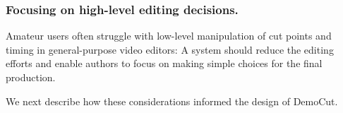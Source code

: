 \subsubsection{Focusing on high-level editing decisions.}
Amateur users often struggle with low-level manipulation of cut points and timing in general-purpose video editors: A system should reduce the editing efforts and enable authors to focus on making simple choices for the final production.

We next describe how these considerations informed the design of DemoCut.
